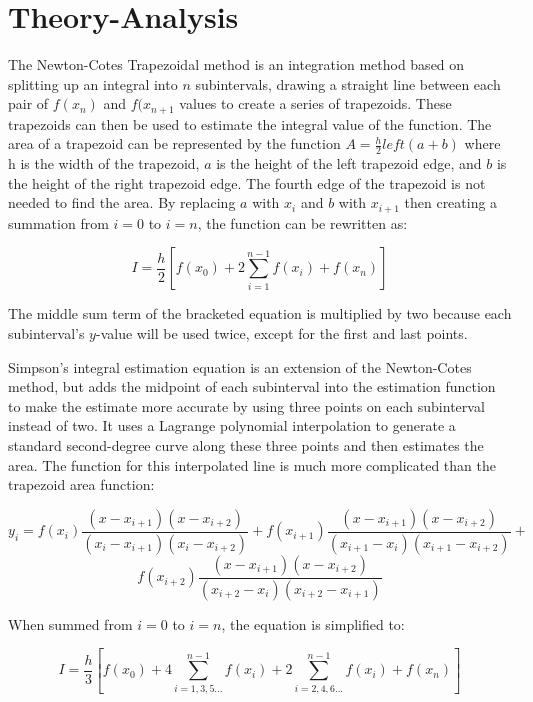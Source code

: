 \documentclass[12pt, letterpaper]{article}
\begin{document}
\section{\label{sec:theory}Theory-Analysis}
	The Newton-Cotes Trapezoidal method is an integration method based on splitting up an integral into $n$ subintervals, drawing a straight line between each pair of $f(x_n)$ and $f(x_{n+1}$ values to create a series of trapezoids. These trapezoids can then be used to estimate the integral value of the function. The area of a trapezoid can be represented by the function $A=\frac{h}{2}left(a+b)$ where h is the width of the trapezoid, $a$ is the height of the left trapezoid edge, and $b$ is the height of the right trapezoid edge. The fourth edge of the trapezoid is not needed to find the area. By replacing $a$ with $x_i$ and $b$ with $x_{i+1}$ then creating a summation from $i=0$ to $i=n$, the function can be rewritten as:
	
	\begin{equation*} I = \frac{h}{2} \left[f(x_0)+2\sum_{i=1}^{n-1}{f(x_i)}+f(x_n)\right] \end{equation*}
	
	The middle sum term of the bracketed equation is multiplied by two because each subinterval's $y$-value will be used twice, except for the first and last points.
	
	Simpson's integral estimation equation is an extension of the Newton-Cotes method, but adds the midpoint of each subinterval into the estimation function to make the estimate more accurate by using three points on each subinterval instead of two. It uses a Lagrange polynomial interpolation to generate a standard second-degree curve along these three points and then estimates the area. The function for this interpolated line is much more complicated than the trapezoid area function:
	
	\begin{equation*} y_i = f(x_i) \frac{(x-x_{i+1})(x-x_{i+2})}{(x_i-x_{i+1})(x_i-x_{i+2})} + 
		f(x_{i+1}) \frac{(x-x_{i+1})(x-x_{i+2})}{(x_{i+1}-x_i)(x_{i+1}-x_{i+2})} + 
	\end{equation*}\begin{equation*}
		f(x_{i+2}) \frac{(x-x_{i+1})(x-x_{i+2})}{(x_{i+2}-x_i)(x_{i+2}-x_{i+1})}
	\end{equation*}
	
	When summed from $i=0$ to $i=n$, the equation is simplified to:
	
	\begin{equation*} I = \frac{h}{3} \left[f(x_0)+4\!\!\!\sum_{i=1, 3, 5...}^{n-1}{\!\!\!f(x_i)}+2\!\!\!\sum_{i=2, 4, 6...}^{n-1}{\!\!\!f(x_i)}+f(x_n)\right] \end{equation*}
	
\end{document}
